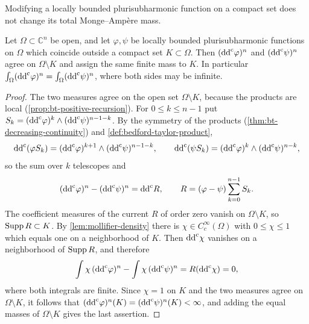 Modifying a locally bounded plurisubharmonic function on a compact set does not change its total Monge--Amp\`ere mass.

\begin{lemma}\label{lem:compact-perturbation-mass}
Let $\Omega\subset\mathbb C^n$ be open, and let $\varphi,\psi$ be locally bounded plurisubharmonic functions on $\Omega$ which coincide outside a compact set $K\subset\Omega$. Then $(\mathrm{dd}^{\mathrm{c}}\varphi)^n$ and $(\mathrm{dd}^{\mathrm{c}}\psi)^n$ agree on $\Omega\setminus K$ and assign the same finite mass to $K$. In particular $\int_\Omega(\mathrm{dd}^{\mathrm{c}}\varphi)^n=\int_\Omega(\mathrm{dd}^{\mathrm{c}}\psi)^n$, where both sides may be infinite.
\end{lemma}
\begin{proof}
The two measures agree on the open set $\Omega\setminus K$, because the products are local (\cref{prop:bt-positive-recursion}). For $0\leq k\leq n-1$ put $S_k=(\mathrm{dd}^{\mathrm{c}}\varphi)^k\wedge(\mathrm{dd}^{\mathrm{c}}\psi)^{n-1-k}$. By the symmetry of the products (\cref{thm:bt-decreasing-continuity}) and \cref{def:bedford-taylor-product},
\[
 \mathrm{dd}^{\mathrm{c}}(\varphi S_k)=(\mathrm{dd}^{\mathrm{c}}\varphi)^{k+1}\wedge(\mathrm{dd}^{\mathrm{c}}\psi)^{n-1-k},
 \qquad
 \mathrm{dd}^{\mathrm{c}}(\psi S_k)=(\mathrm{dd}^{\mathrm{c}}\varphi)^k\wedge(\mathrm{dd}^{\mathrm{c}}\psi)^{n-k},
\]
so the sum over $k$ telescopes and
\[
 (\mathrm{dd}^{\mathrm{c}}\varphi)^n-(\mathrm{dd}^{\mathrm{c}}\psi)^n=\mathrm{dd}^{\mathrm{c}} R,\qquad
 R=(\varphi-\psi)\sum_{k=0}^{n-1}S_k.
\]
The coefficient measures of the current $R$ of order zero vanish on $\Omega\setminus K$, so $\operatorname{Supp} R\subset K$. By \cref{lem:mollifier-density} there is $\chi\in C^\infty_c(\Omega)$ with $0\leq\chi\leq1$ which equals one on a neighborhood of $K$. Then $\mathrm{dd}^{\mathrm{c}}\chi$ vanishes on a neighborhood of $\operatorname{Supp} R$, and therefore
\[
 \int\chi\,(\mathrm{dd}^{\mathrm{c}}\varphi)^n-\int\chi\,(\mathrm{dd}^{\mathrm{c}}\psi)^n=R(\mathrm{dd}^{\mathrm{c}}\chi)=0,
\]
where both integrals are finite. Since $\chi=1$ on $K$ and the two measures agree on $\Omega\setminus K$, it follows that $(\mathrm{dd}^{\mathrm{c}}\varphi)^n(K)=(\mathrm{dd}^{\mathrm{c}}\psi)^n(K)<\infty$, and adding the equal masses of $\Omega\setminus K$ gives the last assertion.
\end{proof}

